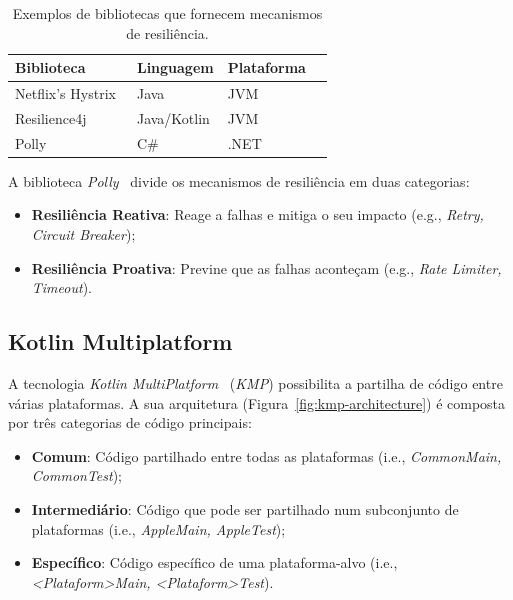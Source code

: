 \begin{table}[h]
    \centering
    \caption{Exemplos de bibliotecas que fornecem mecanismos de resiliência.}
    \label{tab:resilience_libraries}
    \begin{tabular}{|l|l|l|l|}
        \hline
        \textbf{Biblioteca}                      & \textbf{Linguagem} & \textbf{Plataforma} \\ \hline
        Netflix's Hystrix~\cite{netflix-hystrix} & Java               & JVM                 \\ \hline
        Resilience4j~\cite{resilience4j}         & Java/Kotlin        & JVM                 \\ \hline
        Polly ~\cite{polly-dotnet}               & C\#                & .NET                \\
        \hline
    \end{tabular}
\end{table}

A biblioteca \textit{Polly}~\cite{polly-dotnet} divide os mecanismos de resiliência em duas categorias:

\begin{itemize}[topsep=0pt,itemsep=0pt,partopsep=0pt, parsep=0pt]
    \item \textbf{Resiliência Reativa}: Reage a falhas e mitiga o seu impacto (e.g., \textit{Retry, Circuit Breaker});
    \item \textbf{Resiliência Proativa}: Previne que as falhas aconteçam (e.g., \textit{Rate Limiter, Timeout}).
\end{itemize}

\subsection{Kotlin Multiplatform}\label{subsec:kotlin-multiplatform}

A tecnologia \textit{Kotlin MultiPlatform}~\cite{kmp} (\textit{KMP}) possibilita a partilha de código entre várias plataformas. A sua arquitetura (Figura~\ref{fig:kmp-architecture}) é composta por três categorias de código principais:

\begin{itemize}[topsep=0pt,itemsep=0pt,partopsep=0pt, parsep=0pt]
    \item \textbf{Comum}: Código partilhado entre todas as plataformas (i.e., \textit{CommonMain, CommonTest});
    \item \textbf{Intermediário}: Código que pode ser partilhado num subconjunto de plataformas (i.e., \textit{AppleMain, AppleTest});
    \item \textbf{Específico}: Código específico de uma plataforma-alvo (i.e., \textit{\textless Plataform\textgreater Main, \textless Plataform\textgreater Test}).
\end{itemize}

